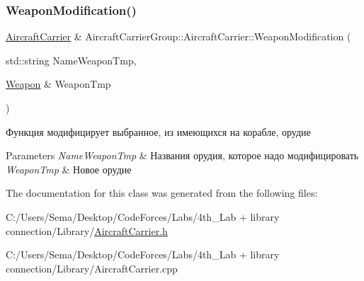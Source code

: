 \subsubsection{\texorpdfstring{Weapon\+Modification()}{WeaponModification()}}
{\footnotesize\ttfamily \mbox{\hyperlink{class_aircraft_carrier_group_1_1_aircraft_carrier}{Aircraft\+Carrier}} \& Aircraft\+Carrier\+Group\+::\+Aircraft\+Carrier\+::\+Weapon\+Modification (\begin{DoxyParamCaption}\item[{std\+::string}]{Name\+Weapon\+Tmp,  }\item[{\mbox{\hyperlink{class_aircraft_carrier_group_1_1_weapon}{Weapon}} \&}]{Weapon\+Tmp }\end{DoxyParamCaption})}



Функция модифицирует выбранное, из имеющихся на корабле, орудие 


\begin{DoxyParams}{Parameters}
{\em Name\+Weapon\+Tmp} & Названия орудия, которое надо модифицировать \\
\hline
{\em Weapon\+Tmp} & Новое орудие \\
\hline
\end{DoxyParams}


The documentation for this class was generated from the following files\+:\begin{DoxyCompactItemize}
\item 
C\+:/\+Users/\+Sema/\+Desktop/\+Code\+Forces/\+Labs/4th\+\_\+\+Lab + library connection/\+Library/\mbox{\hyperlink{_aircraft_carrier_8h}{Aircraft\+Carrier.\+h}}\item 
C\+:/\+Users/\+Sema/\+Desktop/\+Code\+Forces/\+Labs/4th\+\_\+\+Lab + library connection/\+Library/Aircraft\+Carrier.\+cpp\end{DoxyCompactItemize}
